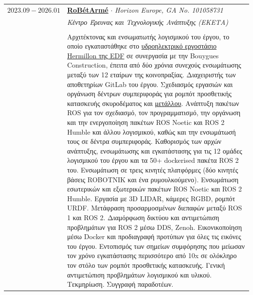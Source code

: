 \documentclass[a4paper,10pt,twoside]{article}
\begin{document}
\begin{tabular}{rp{11cm}}
$2023.09 - 2026.01$ & \href{https://www.robetarme-project.eu/}{\textbf{RoBétArmé}} $\cdot$ \textit{Horizon Europe, GA No. 101058731} \\
                           & \textit{Κέντρο Έρευνας και Τεχνολογικής Ανάπτυξης (ΕΚΕΤΑ)}\\
\\
                           & Αρχιτέκτονας και ενσωματωτής λογισμικού του έργου, το οποίο εγκαταστάθηκε στο \href{https://www.gem.wiki/Hermillon_hydroelectric_plant}{υδροηλεκτρικό εργοστάσιο Hermillon της EDF} σε συνεργασία με την Bouygues Construction, έπειτα από δύο χρόνια συνεχούς ενσωμάτωσης μεταξύ των 12 εταίρων της κοινοπραξίας. Διαχειριστής των αποθετηρίων GitLab του έργου. Σχεδιασμός εργασιών και οργάνωση δέντρων συμπεριφοράς για ρομπότ προσθετικής κατασκευής σκυροδέματος και \href{https://www.youtube.com/watch?v=xuIbOL-MPRk}{μετάλλου}. Ανάπτυξη πακέτων ROS για τον σχεδιασμό, τον προγραμματισμό, την οργάνωση και την ενεργοποίηση πακέτων ROS Noetic και ROS 2 Humble και άλλου λογισμικού, καθώς και την ενσωμάτωσή τους σε δέντρα συμπεριφοράς. Καθορισμός των αρχών ανάπτυξης, ενσωμάτωσης και εγκατάστασης για τις 12 ομάδες λογισμικού του έργου και τα 50+ dockerised πακέτα ROS 2 του. Ενσωμάτωση σε τρεις κινητές πλατφόρμες (δύο κινητές βάσεις ROBOTNIK και ένα ρυμουλκούμενο). Ενσωμάτωση εσωτερικών και εξωτερικών πακέτων ROS Noetic και ROS 2 Humble. Εργασία με 3D LIDAR, κάμερες RGBD, ρομπότ URDF. Μετάφραση προσαρμοσμένων διεπαφών μεταξύ ROS 1 και ROS 2. Διαμόρφωση δικτύου και αντιμετώπιση προβλημάτων για ROS 2 μέσω DDS, Zenoh. Εικονικοποίηση μέσω Docker και προδιαγραφή προτύπων για όλες τις εικόνες του έργου. Εντοπισμός των σημείων συμφόρησης που μείωσαν τον χρόνο εγκατάστασης περισσότερο από 10x σε ολόκληρο τον στόλο των ρομπότ προσθετικής κατασκευής. Γενική αντιμετώπιση προβλημάτων λογισμικού και υλικού. Τεκμηρίωση. Συγγραφή παραδοτέων. \\
\end{tabular}

\vspace{1.5em}
\end{document}
